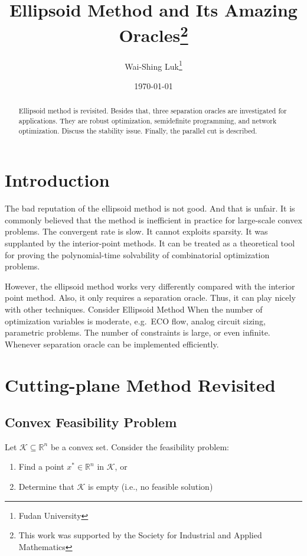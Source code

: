 \documentclass[final,leqno]{siamltex}
\title{Ellipsoid Method and Its Amazing Oracles\thanks{This work was supported by the Society for Industrial and Applied Mathematics}}
\author{Wai-Shing Luk\thanks{Fudan University}}
\date{\today}
\providecommand{\tightlist}{%
  \setlength{\itemsep}{0pt}\setlength{\parskip}{0pt}}
\begin{document}
\maketitle
\begin{abstract}
Ellipsoid method is revisited. Besides that, three separation oracles are investigated for applications. They are robust optimization, semidefinite programming, and network optimization. Discuss the stability issue. Finally, the parallel cut is described.
\end{abstract}

\hypertarget{sec:introduction}{%
\section{Introduction}\label{sec:introduction}}

The bad reputation of the ellipsoid method is not good. And that is unfair. It is commonly believed that the method is inefficient in practice for large-scale convex problems. The convergent rate is slow. It cannot exploits sparsity. It was supplanted by the interior-point methods. It can be treated as a theoretical tool for proving the polynomial-time solvability of combinatorial optimization problems.

However, the ellipsoid method works very differently compared with the interior point method. Also, it only requires a separation oracle. Thus, it can play nicely with other techniques. Consider Ellipsoid Method When the number of optimization variables is moderate, e.g.~ECO flow, analog circuit sizing, parametric problems. The number of constraints is large, or even infinite. Whenever separation oracle can be implemented efficiently.

\hypertarget{sec:cutting-plane-method-revisited}{%
\section{Cutting-plane Method Revisited}\label{sec:cutting-plane-method-revisited}}

\hypertarget{sec:convex-feasibility-problem}{%
\subsection{Convex Feasibility Problem}\label{sec:convex-feasibility-problem}}

Let \(\mathcal{K} \subseteq \mathbb{R}^n\) be a convex set. Consider the feasibility problem:

\begin{enumerate}
\def\labelenumi{\arabic{enumi}.}
\tightlist
\item
  Find a point \(x^* \in \mathbb{R}^n\) in \(\mathcal{K}\), or
\item
  Determine that \(\mathcal{K}\) is empty (i.e., no feasible solution)
\end{enumerate}
\end{document}
